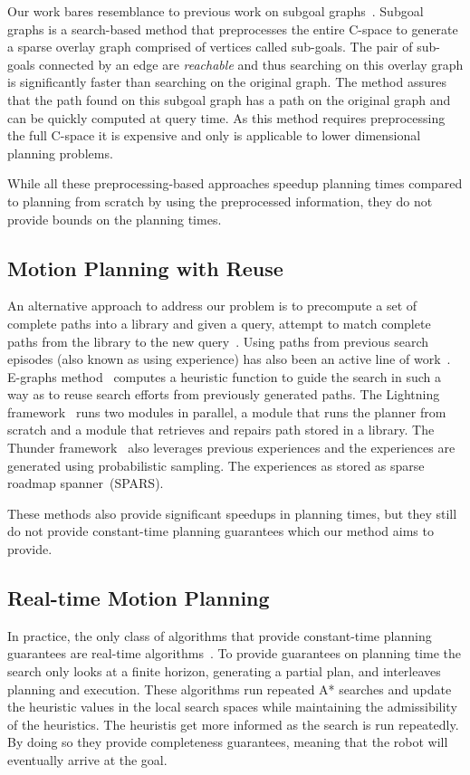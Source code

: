 \documentclass[a4paper,10pt]{article}
\begin{document}
Our work bares resemblance to previous work on 
subgoal graphs~\cite{UK17,UK18}.
Subgoal graphs is a search-based method that preprocesses the entire C-space to generate a sparse overlay graph comprised of vertices called sub-goals. The pair of sub-goals connected by an edge are \emph{reachable} and thus searching on this overlay graph is significantly faster than searching on the original graph. The method assures that the path found on this subgoal graph has a path on the original graph and can be quickly computed at query time. As this method requires preprocessing the full C-space it is expensive and only is applicable to lower dimensional planning problems.

While all these preprocessing-based approaches speedup planning times compared to planning from scratch by using the preprocessed information, they do not provide bounds on the planning times.


\subsection{Motion Planning with Reuse}
An alternative approach to address our problem is to precompute a set of complete paths into a library and given a query, attempt to match complete paths from the library to the new query~\cite{berenson2012robot,jetchev2013fast}.
Using paths from previous search episodes (also known as using experience) has also been an active line of work~\cite{PCCL12,PDCL13,BAG12,CSMOC15}. E-graphs method~\cite{PCCL12} computes a heuristic function to guide the search in such a way as to reuse search efforts from previously generated paths. The Lightning framework~\cite{BAG12} runs two modules in parallel, a module that runs the planner from scratch and a module that retrieves and repairs path stored in a library. The Thunder framework~\cite{CSMOC15} also leverages previous experiences and the experiences are generated using probabilistic sampling. The experiences as stored as sparse roadmap spanner~(SPARS). 

These methods also provide significant speedups in planning times, but they still do not provide constant-time planning guarantees which our method aims to provide.

\subsection{Real-time Motion Planning}
In practice, the only class of algorithms that provide constant-time planning guarantees are real-time algorithms~\cite{KL06,KS09,K90}.
To provide guarantees on planning time the search only looks at a finite horizon, generating a partial plan, and interleaves planning and execution. These algorithms run repeated A* searches and update the heuristic values in the local search spaces while maintaining the admissibility of the heuristics. The heuristis get more informed as the search is run repeatedly. By doing so they provide completeness guarantees, meaning that the robot will eventually arrive at the goal.
\end{document}
